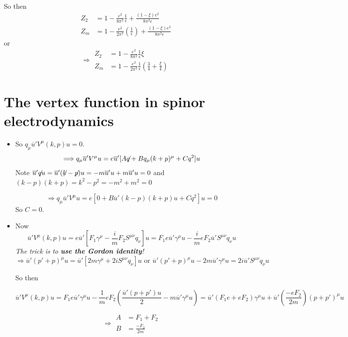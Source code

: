 \documentclass[twoside]{amsart}
\newcommand{\solutionhead}[1]
  {\smallskip
   \noindent{\large\bf Solution #1.}
   }
\begin{document}
So then 
\[
\begin{aligned}
  Z_2 & = 1  -\frac{e^2}{8\pi^2} \frac{1}{ \epsilon} + \frac{ (1 - \xi ) e^2 }{ 8\pi^2 \epsilon } \\ 
  Z_m & = 1 - \frac{e^2}{ 2\pi^2 } \left( \frac{1}{ \epsilon } \right) + \frac{ (1 - \xi ) e^2}{ 8\pi^2 \epsilon }
\end{aligned}
\]
or
\[
\Longrightarrow \boxed{ \begin{aligned} 
    Z_2 & = 1 - \frac{e^2}{ 8 \pi^2 } \frac{1}{ \epsilon } \xi \\
    Z_m & = 1 - \frac{e^2}{ 2\pi^2} \frac{1}{ \epsilon } \left( \frac{3}{4} + \frac{\xi }{4} \right) \end{aligned} }
\]

\section{The vertex function in spinor electrodynamics}

\solutionhead{63.1}
\begin{itemize}
\item[(a)] 


So $q_{\mu} \overline{u}' V^{\mu}(k,p) u = 0$.  
\[
\Longrightarrow q_{\mu} \overline{u}' V^{\mu} u = e\overline{u}' [A {\not}{q} + B q_{\mu}( k +p)^{\mu} + C q^2 ] u 
\]
Note $\overline{u}' {\not}{q} u = \overline{u}' ({\not}{k} - {\not}{p} )u = - m \overline{u}' u + m \overline{u}'  u = 0$ and $(k-p) (k+p) = k^2 - p^2 = - m^2 + m^2 = 0$

\[
\Longrightarrow q_{\mu} \overline{u}' V^{\mu} u = e[ 0 + B \overline{u}' (k-p)(k+p) u + C q^2] u = 0 
\]
So $C=0$.  
\item[(b)] Now
\[
\overline{u}' V^{\mu}(k,p) u = e\overline{u}' [ F_1 \gamma^{\mu} - \frac{i}{m} F_2 S^{\mu \nu } q_{\nu} ]u = F_1 e \overline{u}' \gamma^{\mu} u - \frac{i}{m} eF_2 \overline{u}' S^{\mu \nu} q_{\nu} u 
\]
\emph{The trick is to \textbf{use the Gordon identity}!}
\[
\Longrightarrow \overline{u}' (p' + p)^{\mu} u = \overline{u}' [2m \gamma^{\mu} + 2i S^{\mu \nu} q_{\nu} ] u \text{ or }  \overline{u}' (p'+p)^{\mu} u  - 2m \overline{u}' \gamma^{\mu} u = 2i \overline{u}' S^{\mu \nu} q_{\nu} u 
\]

So then

\[
\overline{u}' V^{\mu}(k,p) u = F_1 e\overline{u}' \gamma^{\mu} u - \frac{1}{m} eF_2 \left( \frac{ \overline{u}' (p + p') u }{2} - m \overline{u}' \gamma^{\mu} u \right) = \overline{u}' (F_1 e + eF_2) \gamma^{\mu} u + \overline{u}' \left( \frac{ - eF_2}{ 2m } \right) ( p + p')^{\mu} u 
\]

\[
\Longrightarrow \boxed{ \begin{aligned} A & = F_1 + F_2  \\ B & = \frac{ -F_2}{ 2m } \end{aligned} }
\]


\end{itemize}
\end{document}
